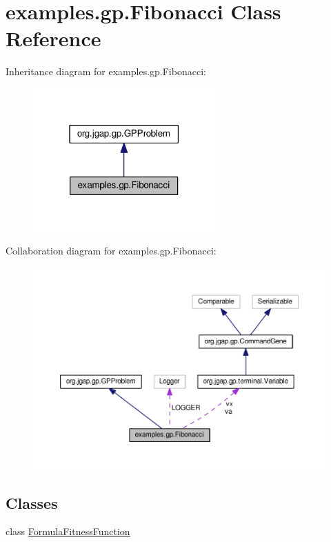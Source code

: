 \hypertarget{classexamples_1_1gp_1_1_fibonacci}{\section{examples.\-gp.\-Fibonacci Class Reference}
\label{classexamples_1_1gp_1_1_fibonacci}
}


Inheritance diagram for examples.\-gp.\-Fibonacci\-:
\nopagebreak
\begin{figure}[H]
\begin{center}
\leavevmode
\includegraphics[width=198pt]{classexamples_1_1gp_1_1_fibonacci__inherit__graph}
\end{center}
\end{figure}


Collaboration diagram for examples.\-gp.\-Fibonacci\-:
\nopagebreak
\begin{figure}[H]
\begin{center}
\leavevmode
\includegraphics[width=350pt]{classexamples_1_1gp_1_1_fibonacci__coll__graph}
\end{center}
\end{figure}
\subsection*{Classes}
\begin{DoxyCompactItemize}
\item 
class \hyperlink{classexamples_1_1gp_1_1_fibonacci_1_1_formula_fitness_function}{Formula\-Fitness\-Function}
\end{DoxyCompactItemize}
